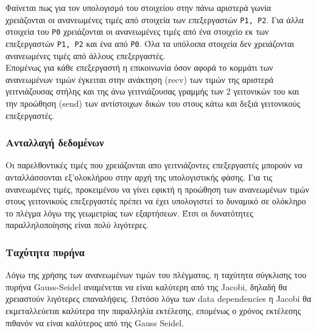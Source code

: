 \documentclass[11pt,a4paper]{article}
\begin{document}
Φαίνεται πως για τον υπολογισμό του στοιχείου στην πάνω αριστερά γωνία χρειάζονται οι ανανεωμένες τιμές από στοιχεία των επεξεργαστών \texttt{P1, P2}. Για άλλα στοιχεία του \texttt{P0} χρειάζονται οι ανανεωμένες τιμές από ένα στοιχείο εκ των επεξεργαστών \texttt{P1, P2} και ένα από \texttt{P0}. Όλα τα υπόλοιπα στοιχεία δεν χρειάζονται ανανεωμένες τιμές από άλλους επεξεργαστές. \\
Επομένως για κάθε επεξεργαστή η επικοινωνία όσον αφορά το κομμάτι των ανανεωμένων τιμών έγκειται στην ανάκτηση (recv) των τιμών της αριστερά γειτνιάζουσας στήλης και της άνω γειτνιάζουσας γραμμής των 2 γειτονικών του και την προώθηση (send) των αντίστοιχων δικών του στους κάτω και δεξιά γειτονικούς επεξεργαστές. 
\subsubsection{Ανταλλαγή δεδομένων}
Οι παρελθοντικές τιμές που χρειάζονται απο γειτνιάζοντες επεξεργαστές μπορούν να ανταλλάσσονται εξ'ολοκλήρου στην αρχή της υπολογιστικής φάσης. Για τις ανανεωμένες τιμές, προκειμένου να γίνει εφικτή η προώθηση των ανανεωμένων τιμών στους γειτονικούς επεξεργαστές πρέπει να έχει υπολογιστεί το δυναμικό σε ολόκληρο το πλέγμα λόγω της γεωμετρίας των εξαρτήσεων. Έτσι οι δυνατότητες παραλληλοποίησης είναι πολύ λιγότερες.	
\subsubsection{Ταχύτητα πυρήνα}
Λόγω της χρήσης των ανανεωμένων τιμών του πλέγματος, η ταχύτητα σύγκλισης του πυρήνα Gauss-Seidel αναμένεται να είναι καλύτερη από της Jacobi, δηλαδή θα χρειαστούν λιγότερες επαναλήψεις. Ωστόσο λόγω των data dependencies η Jacobi θα εκμεταλλεύεται καλύτερα την παραλληλία εκτέλεσης, επομένως ο χρόνος εκτέλεσης πιθανόν να είναι καλύτερος από της Gauss Seidel. 
\end{document}
